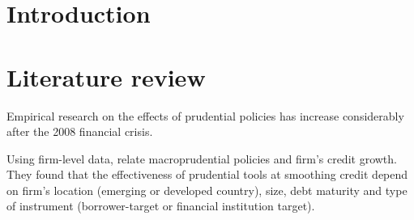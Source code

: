 \documentclass[12pt]{article}
\begin{document}
	
	\pagebreak \newpage
	
	
	
	
	\doublespacing
	
	
	\section{Introduction} \label{sec:introduction}
	
	\section{Literature review} \label{sec:literature}
	Empirical research on the effects of prudential policies has increase considerably after the 2008 financial crisis. \cite{jimenez2012macroprudential}
	
	Using firm-level data, \cite*{ayyagari2017credit} relate macroprudential policies and firm's credit growth. They found that the effectiveness of prudential tools at smoothing credit depend on firm's location (emerging or developed country), size, debt maturity and type of instrument (borrower-target or financial institution target).
	
\end{document}
